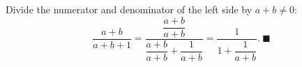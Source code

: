 Divide the numerator and denominator of the left side by $a+b\ne0$:
\[\dfrac{a+b}{a+b+1}=\dfrac{\dfrac{a+b}{a+b}}{\dfrac{a+b}{a+b}+\dfrac{1}{a+b}}=\dfrac{1}{1+\dfrac{1}{a+b}}.\ \blacksquare\]

